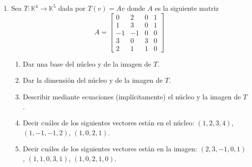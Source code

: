 \begin{enumerate}[topsep=6pt, itemsep=.4cm]
    
    
    \item\label{tl-matriz} Sea $T: \mathbb{K}^4 \to \mathbb{K}^5$ dada por $T(v) = Av$ donde $A$ es la siguiente matriz
        $$
        A=\begin{bmatrix}
        0& 2& 0&1\\   1& 3& 0&1\\  -1&-1&0&0\\3&0&3&0\\2&1&1&0 \end{bmatrix}
        $$
        \begin{enumerate}[topsep=5pt,itemsep=5pt]
            \item\label{tl-matriz-a} Dar una base del núcleo y de la imagen de $T$. 
            \item\label{tl-matriz-b} Dar la dimensión del núcleo y de la imagen de $T$.
            \item\label{tl-matriz-c} Describir mediante ecuaciones (implícitamente) el núcleo y la imagen de $T$.
            \item\label{tl-matriz-d} Decir cuáles de los siguientes vectores están en el núcleo:
            $(1,2,3,4)$, $(1,-1,-1,2)$, $(1,0,2,1)$.
            \item\label{tl-matriz-e} Decir cuáles de los siguientes vectores están en la imagen:
            $(2,3,-1,0,1)$, $(1,1,0,3,1)$, $(1,0,2,1,0)$.
        \end{enumerate}
        
    \rta


\end{enumerate}
